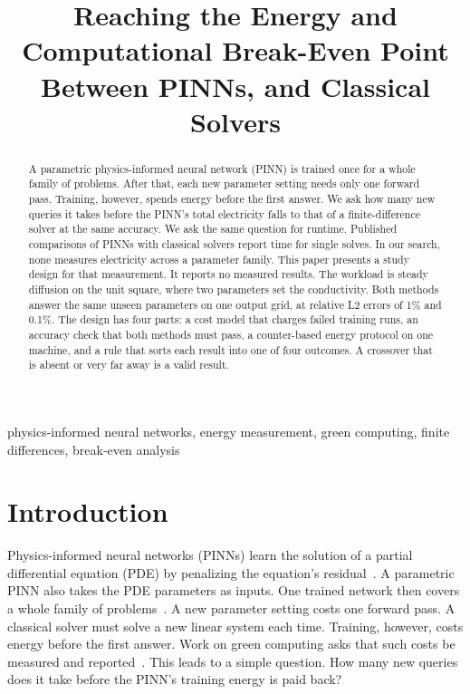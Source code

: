 \documentclass[conference]{IEEEtran}
\begin{document}

\title{Reaching the Energy and Computational Break-Even Point Between PINNs, and Classical Solvers}

\author{
}

\maketitle

\begin{abstract}
A parametric physics-informed neural network (PINN) is trained once for a whole family of problems. After that, each new parameter setting needs only one forward pass. Training, however, spends energy before the first answer. We ask how many new queries it takes before the PINN's total electricity falls to that of a finite-difference solver at the same accuracy. We ask the same question for runtime. Published comparisons of PINNs with classical solvers report time for single solves. In our search, none measures electricity across a parameter family. This paper presents a study design for that measurement. It reports no measured results. The workload is steady diffusion on the unit square, where two parameters set the conductivity. Both methods answer the same unseen parameters on one output grid, at relative L2 errors of 1\% and 0.1\%. The design has four parts: a cost model that charges failed training runs, an accuracy check that both methods must pass, a counter-based energy protocol on one machine, and a rule that sorts each result into one of four outcomes. A crossover that is absent or very far away is a valid result.
\end{abstract}

\begin{IEEEkeywords}
physics-informed neural networks, energy measurement, green computing, finite differences, break-even analysis
\end{IEEEkeywords}

\section{Introduction}

Physics-informed neural networks (PINNs) learn the solution of a partial differential equation (PDE) by penalizing the equation's residual~\cite{raissi2019,karniadakis2021,cuomo2022,toscano2025}. A parametric PINN also takes the PDE parameters as inputs. One trained network then covers a whole family of problems~\cite{sun2020,wang2021deeponet}. A new parameter setting costs one forward pass. A classical solver must solve a new linear system each time. Training, however, costs energy before the first answer. Work on green computing asks that such costs be measured and reported~\cite{strubell2019,schwartz2020,patterson2022}. This leads to a simple question. How many new queries does it take before the PINN's training energy is paid back?
\end{document}
